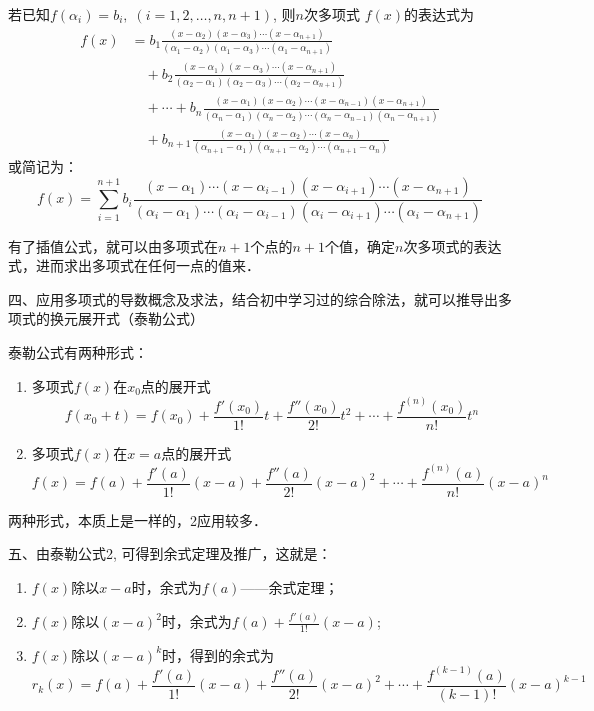 若已知$f(\alpha_i)=b_i,\; (i=1,2,\ldots,n,n+1)$, 则$n$次多项式
$f(x)$的表达式为
\[\begin{split}
f(x)&=b_1\frac{(x-\alpha_2)(x-\alpha_{3})\cdots (x-\alpha_{n+1})}{(\alpha_1-\alpha_2)(\alpha_1-\alpha_3)\cdots (\alpha_1-\alpha_{n+1})}\\
&\quad +b_2\frac{(x-\alpha_1)(x-\alpha_{3})\cdots (x-\alpha_{n+1})}{(\alpha_2-\alpha_1)(\alpha_2-\alpha_3)\cdots (\alpha_2-\alpha_{n+1})}\\
&\quad +\cdots +b_n\frac{(x-\alpha_1)(x-\alpha_{2})\cdots (x-\alpha_{n-1})(x-\alpha_{n+1})}{(\alpha_n-\alpha_1)(\alpha_n-\alpha_2)\cdots (\alpha_n-\alpha_{n-1})(\alpha_n-\alpha_{n+1})}\\
&\quad +b_{n+1}\frac{(x-\alpha_1)(x-\alpha_{2})\cdots (x-\alpha_{n})}{(\alpha_{n+1}-\alpha_1)(\alpha_{n+1}-\alpha_2)\cdots (\alpha_{n+1}-\alpha_{n})}
\end{split}\]
或简记为：
\[f(x)=\sum^{n+1}_{i=1} b_i\frac{(x-\alpha_1)\cdots(x-\alpha_{i-1}) (x-\alpha_{i+1})\cdots(x-\alpha_{n+1})}{(\alpha_i-\alpha_1)\cdots(\alpha_i-\alpha_{i-1}) (\alpha_i-\alpha_{i+1})\cdots(\alpha_i-\alpha_{n+1})}\]

有了插值公式，就可以由多项式在$n+1$个点的$n+1$个值，确定$n$次多项式的表达式，进而求出多项式在任何一点的值来．

四、应用多项式的导数概念及求法，结合初中学习过的综合除法，就可以推导出多项式的换元展开式（泰勒公式）

泰勒公式有两种形式：
\begin{enumerate}
    \item 多项式$f(x)$在$x_0$点的展开式
    \[f(x_0+t)=f(x_0)+\frac{f'(x_0)}{1!}t+\frac{f''(x_0)}{2!}t^2+\cdots+\frac{f^{(n)}(x_0)}{n!}t^n\]
    \item 多项式$f(x)$在$x=a$点的展开式
    \[f(x)=f(a)+\frac{f'(a)}{1!}(x-a)+\frac{f''(a)}{2!}(x-a)^2+\cdots+\frac{f^{(n)}(a)}{n!}(x-a)^n\]
\end{enumerate}
两种形式，本质上是一样的，2应用较多．

五、由泰勒公式2, 可得到余式定理及推广，这就是：
\begin{enumerate}
    \item $f(x)$除以$x-a$时，余式为$f(a)$——余式定理；
    \item $f(x)$除以$(x-a)^2$时，余式为$f(a)+\frac{f'(a)}{1!}(x-a)$;
    \item $f(x)$除以$(x-a)^k$时，得到的余式为
    \[r_k (x) =f (a) +\frac{f'(a)}{1!}(x-a)+\frac{f''(a)}{2!}(x-a)^2+\cdots +\frac{f^{(k-1)}(a)}{(k-1)!}(x-a)^{k-1}\]
\end{enumerate}


